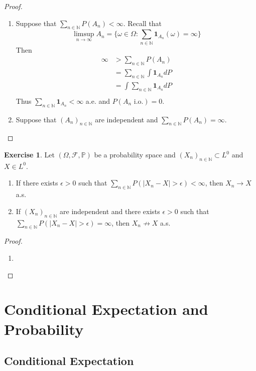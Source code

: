\documentclass[12pt]{amsart}
\theoremstyle{definition}
\newtheorem{ex}[definition]{Exercise}
\newcommand{\ep}{\epsilon}
\newcommand{\om}{\omega}
\newcommand{\Om}{\Omega}
\newcommand{\N}{\mathbb{N}}
\renewcommand{\P}{\mathbb{P}}
\newcommand{\MF}{\mathcal{F}}
\newcommand{\io}{\text{ i.o.}}
\begin{document}
	\begin{proof}\
		\begin{enumerate}
			\item Suppose that $\sum\limits_{n \in \N}P(A_n) < \infty$. Recall that $$\limsup\limits_{n \rightarrow \infty}A_n = \bigg \{\om \in \Om: \sum\limits_{n \in \N}\mathbf{1}_{A_n}(\om) = \infty \bigg \}$$ Then \begin{align*}
				\infty 
				&> \sum_{n \in \N}P(A_n) \\
				&= \sum_{n \in \N} \int \mathbf{1}_{A_n}dP \\
				&= \int \sum_{n \in \N} \mathbf{1}_{A_n}dP \\
			\end{align*}
			Thus $\sum\limits_{n \in \N} \mathbf{1}_{A_n} < \infty$ a.e. and $P(A_n \io) = 0$.
			\item Suppose that $(A_n)_{n \in \N}$ are independent and $\sum\limits_{n \in \N} P(A_n) = \infty$.
		\end{enumerate}
	\end{proof}
	
	\begin{ex}
		Let $(\Om, \MF, \P)$ be a probability space and $(X_n)_{n \in \N} \subset L^0$ and $X \in L^0$. 
		\begin{enumerate}
			\item If there exists $\ep >0 $ such that $\sum\limits_{n \in \N} P(|X_n -X| > \ep) < \infty$, then $X_n \rightarrow X$ a.s.
			\item If $(X_n)_{n \in \N}$ are independent and there exists $\ep >0$ such that $\sum\limits_{n \in \N} P(|X_n -X| > \ep) = \infty$, then $X_n \not \rightarrow X$ a.s.
		\end{enumerate}
	\end{ex}
	
	\begin{proof}
		\begin{enumerate}
			\item 
		\end{enumerate}
	\end{proof}
	\newpage
	
	
	\section{Conditional Expectation and Probability}
	
	\subsection{Conditional Expectation}
	
\end{document}
